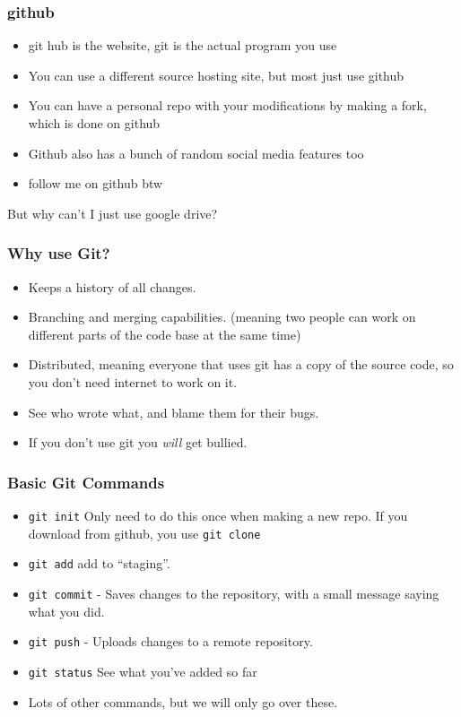 \documentclass[aspectratio=169,hyperref={unicode}]{beamer}
\begin{document}
\begin{frame}
\frametitle{github}
\begin{itemize}
  \item git hub is the website, git is the actual program you use
        \item  You can use a different source hosting site, but most just use github
        \item You can have a personal repo with your modifications by making a fork, which is done on github
        \item Github also has a bunch of random social media features too
        \item follow me on github btw
\end{itemize}
\end{frame}

\begin{frame}
But why can't I just use google drive?
\end{frame}

\begin{frame}
\frametitle{Why use Git?}
\begin{itemize}
\item Keeps a history of all changes.
\item Branching and merging capabilities. (meaning two people can work on different parts of the code base at the same time)
\item Distributed, meaning everyone that uses git has a copy of the source code, so you don't need internet to work on it.
        \item See who wrote what, and blame them for their bugs.
        \item If you don't use git you \emph{will} get bullied.
\end{itemize}
\end{frame}

\begin{frame}
\frametitle{Basic Git Commands}
\begin{itemize}
\item \texttt{git init} Only need to do this once when making a new repo.
        If you download from github, you use \texttt{git clone}
\item \texttt{git add} add to ``staging''.
\item \texttt{git commit} - Saves changes to the repository, with a small message saying what you did.
\item \texttt{git push} - Uploads changes to a remote repository.
\item \texttt{git status} See what you've added so far
        \item Lots of other commands, but we will only go over these.
\end{itemize}
\end{frame}
\end{document}

